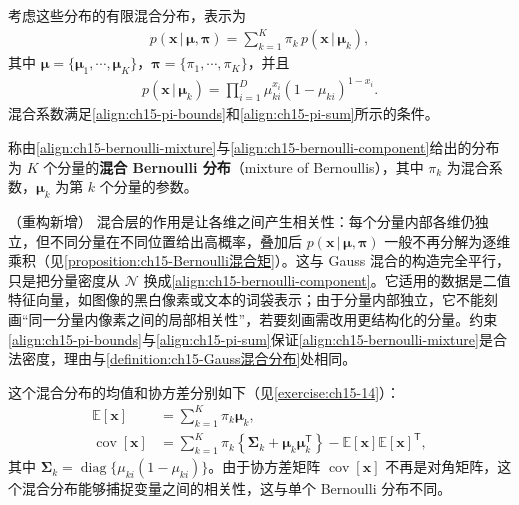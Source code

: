 \documentclass[../../main.tex]{subfiles}
\begin{document}
考虑这些分布的有限混合分布，表示为
\begin{align}
p(\bm{x}\,|\,\bm{\mu},\bm{\pi})=\sum_{k=1}^{K}\pi_k\,p(\bm{x}\,|\,\bm{\mu}_k),
\label{align:ch15-bernoulli-mixture}
\end{align}
其中 $\bm{\mu}=\{\bm{\mu}_1,\cdots,\bm{\mu}_K\}$，$\bm{\pi}=\{\pi_1,\cdots,\pi_K\}$，并且
\begin{align}
p(\bm{x}\,|\,\bm{\mu}_k)=\prod_{i=1}^{D}\mu_{ki}^{x_i}(1-\mu_{ki})^{1-x_i}.
\label{align:ch15-bernoulli-component}
\end{align}
混合系数满足\eqref{align:ch15-pi-bounds}和\eqref{align:ch15-pi-sum}所示的条件。

\begin{definition}[混合 Bernoulli 分布]\label{definition:ch15-混合Bernoulli分布}
称由\eqref{align:ch15-bernoulli-mixture}与\eqref{align:ch15-bernoulli-component}给出的分布为 $K$ 个分量的\textbf{混合 Bernoulli 分布}（mixture of Bernoullis），其中 $\pi_k$ 为混合系数，$\bm{\mu}_k$ 为第 $k$ 个分量的参数。
\end{definition}

\begin{remark}（重构新增）
混合层的作用是让各维之间产生相关性：每个分量内部各维仍独立，但不同分量在不同位置给出高概率，叠加后 $p(\bm{x}\,|\,\bm{\mu},\bm{\pi})$ 一般不再分解为逐维乘积（见\cref{proposition:ch15-Bernoulli混合矩}）。这与 Gauss 混合的构造完全平行，只是把分量密度从 $\mathcal{N}$ 换成\eqref{align:ch15-bernoulli-component}。它适用的数据是二值特征向量，如图像的黑白像素或文本的词袋表示；由于分量内部独立，它不能刻画“同一分量内像素之间的局部相关性”，若要刻画需改用更结构化的分量。约束\eqref{align:ch15-pi-bounds}与\eqref{align:ch15-pi-sum}保证\eqref{align:ch15-bernoulli-mixture}是合法密度，理由与\cref{definition:ch15-Gauss混合分布}处相同。
\end{remark}

这个混合分布的均值和协方差分别如下（见\cref{exercise:ch15-14}）：
\begin{align}
\mathbb{E}[\bm{x}]&=\sum_{k=1}^{K}\pi_k\bm{\mu}_k,
\label{align:ch15-bmm-mean}\\
\operatorname{cov}[\bm{x}]&=\sum_{k=1}^{K}\pi_k\!\left\{\bm{\Sigma}_k+\bm{\mu}_k\bm{\mu}_k^{\mathsf T}\right\}-\mathbb{E}[\bm{x}]\mathbb{E}[\bm{x}]^{\mathsf T},
\label{align:ch15-bmm-cov}
\end{align}
其中 $\bm{\Sigma}_k=\operatorname{diag}\{\mu_{ki}(1-\mu_{ki})\}$。由于协方差矩阵 $\operatorname{cov}[\bm{x}]$ 不再是对角矩阵，这个混合分布能够捕捉变量之间的相关性，这与单个 Bernoulli 分布不同。
\end{document}
